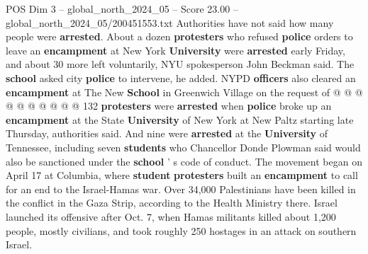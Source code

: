 \begin{textsample}{POS Dim 3 – global\_north\_2024\_05 – Score 23.00 – global\_north\_2024\_05/200451553.txt}
Authorities have not said how many people were \textbf{arrested}.
About a dozen \textbf{protesters} who refused \textbf{police} orders to leave an \textbf{encampment} at New York \textbf{University} were \textbf{arrested} early Friday, and about 30 more left voluntarily, NYU spokesperson John Beckman said.
The \textbf{school} asked city \textbf{police} to intervene, he added.
NYPD \textbf{officers} also cleared an \textbf{encampment} at The New \textbf{School} in Greenwich Village on the request of @ @ @ @ @ @ @ @ @ @ 132 \textbf{protesters} were \textbf{arrested} when \textbf{police} broke up an \textbf{encampment} at the State \textbf{University} of New York at New Paltz starting late Thursday, authorities said.
And nine were \textbf{arrested} at the \textbf{University} of Tennessee, including seven \textbf{students} who Chancellor Donde Plowman said would also be sanctioned under the \textbf{school} ' s code of conduct.
The movement began on April 17 at Columbia, where \textbf{student} \textbf{protesters} built an \textbf{encampment} to call for an end to the Israel-Hamas war.
Over 34,000 Palestinians have been killed in the conflict in the Gaza Strip, according to the Health Ministry there.
Israel launched its offensive after Oct. 7, when Hamas militants killed about 1,200 people, mostly civilians, and took roughly 250 hostages in an attack on southern Israel.

\end{textsample}
